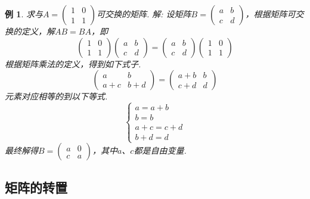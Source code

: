 \documentclass[12pt, a4paper, oneside]{ctexbook}
\newtheorem{example}[theorem]{例}
\begin{document}
\begin{example}
    求与$A=\left ( \begin{matrix}
        1 & 0 \\
        1 & 1
    \end{matrix} \right )$可交换的矩阵. 
    \newline
    解: 设矩阵$B=\left ( \begin{matrix}
        a & b \\
        c & d
    \end{matrix} \right )$，根据矩阵可交换的定义，解$AB = BA$，即$$\left ( \begin{matrix}
        1 & 0 \\
        1 & 1
    \end{matrix} \right ) \left ( \begin{matrix}
        a & b \\
        c & d
    \end{matrix} \right ) = \left ( \begin{matrix}
        a & b \\
        c & d
    \end{matrix} \right ) \left ( \begin{matrix}
        1 & 0 \\
        1 & 1
    \end{matrix} \right )$$
    根据矩阵乘法的定义，得到如下式子. 
    $$\left ( \begin{matrix}
        a & b \\
        a+c & b+d
    \end{matrix} \right ) = \left ( \begin{matrix}
        a+b & b \\
        c+d & d
    \end{matrix} \right )$$
    元素对应相等的到以下等式. 
    $$\begin{cases}
        a = a + b \\
        b = b \\
        a + c = c + d \\
        b + d = d
    \end{cases}$$
    最终解得$B=\left ( \begin{matrix}
        a & 0 \\
        c & a
    \end{matrix} \right )$，其中$a$、$c$都是自由变量. 
\end{example}

\subsection{矩阵的转置}
\end{document}
